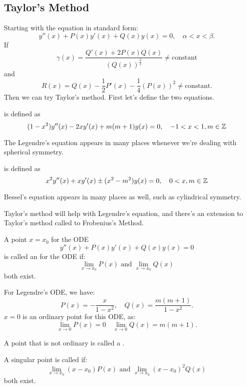 \documentclass[../main/main.tex]{subfiles}
\begin{document}
\subsection{Taylor's Method}
Starting with the equation in standard form: \[
	y''(x) + P(x) y'(x) + Q(x) y(x) = 0, \quad \alpha < x < \beta
.\] If \[
\gamma(x) = \frac{Q'(x) + 2P(x)Q(x)}{\left( Q(x) \right) ^{\frac{3}{2}}}\neq \text{constant}
\] and \[
R(x) = Q(x) -\frac{1}{2}P'(x) -\frac{1}{4}\left( P(x) \right) ^2\neq \text{constant}
.\] Then we can try Taylor's method. First let's define the two equations.
\begin{definition}
	 is defined as \[(1-x^2)y''(x) -2xy'(x) + m(m+1) y(x) = 0,\quad -1<x<1, m\in \mathbb{Z}\]
\end{definition}
\begin{remark}
	The Legendre's equation appears in many places whenever we're dealing with spherical symmetry.
\end{remark}
\begin{definition}
 is defined as \[x^2y''(x) + xy'(x) \pm (x^2-m^2)y(x)=0,\quad 0<x, m\in \mathbb{Z}\]
\end{definition}
\begin{remark}
	Bessel's equation appears in many places as well, such as cylindrical symmetry.
\end{remark}
Taylor's method will help with Legendre's equation, and there's an extension to Taylor's method called to Frobenius's Method.
\begin{definition}
	A point $x=x_0$ for the ODE \[y''(x) + P(x) y'(x) + Q(x)y(x) = 0\] is called an  for the ODE if:  \[
		\lim\limits_{x \to x_0} P(x) \text{ and }\lim\limits_{x \to x_0} Q(x)
	\]  both exist.
\end{definition}
\begin{remark}
	For Legendre's ODE, we have: \[
		P(x) = -\frac{x}{1-x^2},\quad Q(x) = \frac{m(m+1)}{1-x^2}
	.\] $x=0$ is an ordinary point for this ODE, as: \[
	\lim\limits_{x \to 0} P(x) = 0 \quad \lim\limits_{x \to 0} Q(x) = m(m+1)
	.\] 
\end{remark}
\begin{definition}
	A point that is not ordinary is called a .
\end{definition}
\begin{definition}
	A singular point is called  if: \[
		\lim\limits_{x \to x_0} (x-x_0)P(x) \text{ and }\lim\limits_{x \to x_0} (x-x_0)^2Q(x)
	\] both exist. 
\end{definition}
\end{document}
